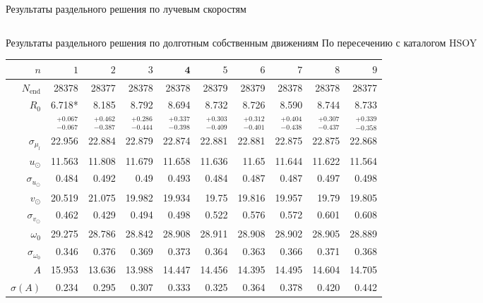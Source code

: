 \documentclass[compress]{beamer}
\newcommand\Fontvi{\fontsize{6}{7.2}\selectfont}
\begin{document}
\begin{frame}{Результаты раздельного решения по лучевым скоростям}
\begin{table}[h!!]
\begin{tabular}{r|rr|r|rrrrrr}
 \end{tabular}
\end{table}

\end{frame}


\begin{frame}{Результаты раздельного решения по долготным собственным движениям}
\Fontvi
По пересечению с каталогом HSOY
\begin{table}[h!!]
\centering
\begin{tabular}{r|rrr|r|rrrrr}
\hline
$n$ & $1$ & $2$ & $3$ & $\textbf{4}$ & $5$&$ 6 $&$ 7 $&$ 8 $&$ 9 $\\\hline
 $N_{\mathrm{end}}$ & 28378       &   28377 &   28378 &   28378 &   28379 &   28379 &   28378 &   28378 &   28377 \\
 $R_0 $& 6.718*      &   8.185 &   8.792 &   8.694 &   8.732 &   8.726 &    8.590 &   8.744 &   8.733 \\
       & $_{-0.067}^{+0.067} $ & $_{-0.387}^{+0.462}$ & $_{-0.444}^{+0.286}$   & $_{-0.398}^{+0.337}$  & $_{-0.409}^{+0.303}$  & $_{-0.401}^{+0.312}$  & $_{-0.438}^{+0.404}$  & $_{-0.437}^{+0.307}$  & $_{-0.358}^{+0.339}$  \\\hline
 $\sigma_{\mu_l} $& 22.956      &  22.884 &  22.879 &  22.874 &  22.881 &  22.881 &  22.875 &  22.875 &  22.868  \\ 
 $ u_{\odot} $& 11.563      &  11.808 &  11.679 &  11.658 &  11.636 &   11.65 &  11.644 &  11.622 &  11.564  \\
 $\sigma_{u_{\odot}} $&0.484       &   0.492 &    0.49 &   0.493 &   0.484 &   0.487 &   0.487 &   0.497 &   0.498  \\
 $v_{\odot} $& 20.519      &  21.075 &  19.982 &  19.934 &   19.75 &  19.816 &  19.957 &   19.79 &  19.805  \\
 $\sigma_{v_{\odot}}$&0.462       &   0.429 &   0.494 &   0.498 &   0.522 &   0.576 &   0.572 &   0.601 &   0.608  \\
 $\omega_0 $&29.275      &  28.786 &  28.842 &  28.908 &  28.911 &  28.908 &  28.902 &  28.905 &  28.889  \\
 $\sigma_{\omega_0} $& 0.346       &   0.376 &   0.369 &   0.373 &   0.364 &   0.363 &   0.366 &   0.371 &   0.368  \\\hline
 $A $&15.953      &  13.636 &  13.988 &  14.447 &  14.456 &  14.395 &  14.495 &  14.604 &  14.705  \\
 $\sigma(A) $ & 0.234       &   0.295 &   0.307 &   0.333 &   0.325 &   0.364 &   0.378 &    0.420 &   0.442  \\

\end{tabular}
\end{table}
\end{frame}
\end{document}
